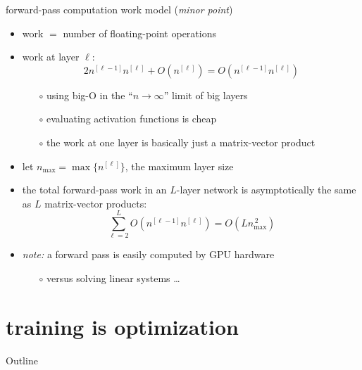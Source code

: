 \documentclass[xcolor={svgnames},
               hyperref={colorlinks,citecolor=DeepPink4,linkcolor=FireBrick,urlcolor=Maroon}]
               {beamer}
\begin{document}
\begin{frame}{forward-pass computation work model (\emph{minor point})}

\begin{itemize}
\item \alert{work} $=$ number of floating-point operations
\item work at layer $\ell$:
    $$2 n^{[\ell-1]} n^{[\ell]} + O(n^{[\ell]}) = O(n^{[\ell-1]} n^{[\ell]})$$

    \begin{itemize}
    \item[$\circ$] using big-O in the ``$n \to \infty$'' limit of big layers
    \item[$\circ$] evaluating activation functions is cheap
    \item[$\circ$] the work at one layer is basically just a matrix-vector product
    \end{itemize}
\item let $n_{\text{max}} =\max\{n^{[\ell]}\}$, the maximum layer size
\item the total forward-pass work in an $L$-layer network is asymptotically the same as $L$ matrix-vector products:
    $$\sum_{\ell=2}^L O(n^{[\ell-1]} n^{[\ell]}) = O(L n_{\text{max}}^{\,2})$$
\item \emph{note:} a forward pass is easily computed by GPU hardware
    \begin{itemize}
    \item[$\circ$] versus solving linear systems \dots
    \end{itemize}
\end{itemize}
\end{frame}


\section{training is optimization}

\begin{frame}{Outline}
\end{frame}
\end{document}

